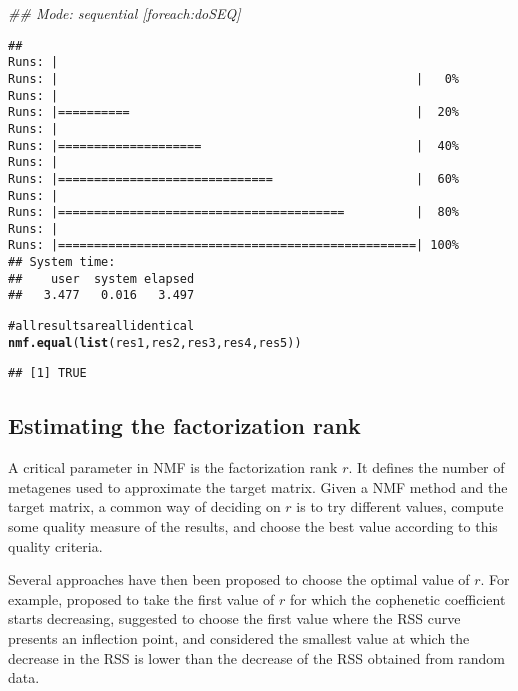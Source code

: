 \documentclass[a4paper]{article}\usepackage{graphicx, color}
\makeatletter
\newcommand{\hlfunctioncall}[1]{\textcolor[rgb]{0.501960784313725,0,0.329411764705882}{\textbf{#1}}}%
\newcommand{\hlcomment}[1]{\textcolor[rgb]{0.180392156862745,0.6,0.341176470588235}{#1}}%
\newenvironment{kframe}{%
 \def\at@end@of@kframe{}%
 \ifinner\ifhmode%
  \def\at@end@of@kframe{\end{minipage}}%
  \begin{minipage}{\columnwidth}%
 \fi\fi%
 \def\FrameCommand##1{\hskip\@totalleftmargin \hskip-\fboxsep
 \colorbox{shadecolor}{##1}\hskip-\fboxsep
     \hskip-\linewidth \hskip-\@totalleftmargin \hskip\columnwidth}%
 \MakeFramed {\advance\hsize-\width
   \@totalleftmargin\z@ \linewidth\hsize
   \@setminipage}}%
 {\par\unskip\endMakeFramed%
 \at@end@of@kframe}
\newenvironment{knitrout}{}{} %
\renewcommand{\cite}[1]{\parencite{#1}}
\makeatother
\begin{document}
\begin{knitrout}
\begin{kframe}
{\ttfamily\noindent\itshape\textcolor{messagecolor}{\#\# Mode: sequential [foreach:doSEQ]}}\begin{verbatim}
## 
Runs: |                                                        
Runs: |                                                  |   0%
Runs: |                                                        
Runs: |==========                                        |  20%
Runs: |                                                        
Runs: |====================                              |  40%
Runs: |                                                        
Runs: |==============================                    |  60%
Runs: |                                                        
Runs: |========================================          |  80%
Runs: |                                                        
Runs: |==================================================| 100%
## System time:
##    user  system elapsed 
##   3.477   0.016   3.497
\end{verbatim}
\begin{alltt}

\hlcomment{# all results are all identical}
\hlfunctioncall{nmf.equal}(\hlfunctioncall{list}(res1, res2, res3, res4, res5))
\end{alltt}
\begin{verbatim}
## [1] TRUE
\end{verbatim}
\end{kframe}
\end{knitrout}



\subsection{Estimating the factorization rank}
A critical parameter in NMF is the factorization rank $r$. 
It defines the number of metagenes used to approximate the target matrix.
Given a NMF method and the target matrix, a common way of deciding on $r$ is to try different values, compute some quality measure of the results, and choose the best value according to this quality criteria.

Several approaches have then been proposed to choose the optimal value of $r$.
For example, \cite{Brunet2004} proposed to take the first value of $r$ for which the cophenetic coefficient starts decreasing, \cite{Hutchins2008} suggested to choose the first value where the RSS curve presents an inflection point, and \cite{Frigyesi2008} considered the smallest value at which the decrease in the RSS is lower than the decrease of the RSS obtained from random data.
\end{document}
